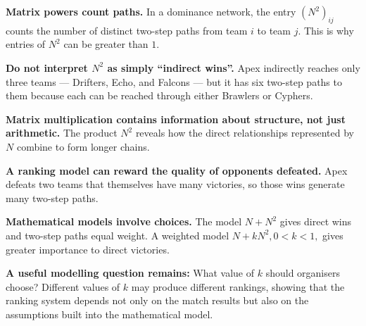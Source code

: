 \begin{takeaways}
    \item \textbf{Matrix powers count paths.} In a dominance network, the entry $(N^2)_{ij}$ counts the number of distinct two-step paths from team $i$ to team $j$. This is why entries of $N^2$ can be greater than $1$.
    \item \textbf{Do not interpret $N^2$ as simply ``indirect wins''.} Apex indirectly reaches only three teams --- Drifters, Echo, and Falcons --- but it has six two-step paths to them because each can be reached through either Brawlers or Cyphers.
    \item \textbf{Matrix multiplication contains information about structure, not just arithmetic.} The product $N^2$ reveals how the direct relationships represented by $N$ combine to form longer chains.
    \item \textbf{A ranking model can reward the quality of opponents defeated.} Apex defeats two teams that themselves have many victories, so those wins generate many two-step paths.
    \item \textbf{Mathematical models involve choices.} The model $N+N^2$ gives direct wins and two-step paths equal weight. A weighted model $N+kN^2, 0<k<1,$ gives greater importance to direct victories.
    \item \textbf{A useful modelling question remains:} What value of $k$ should organisers choose? Different values of $k$ may produce different rankings, showing that the ranking system depends not only on the match results but also on the assumptions built into the mathematical model.
\end{takeaways}

